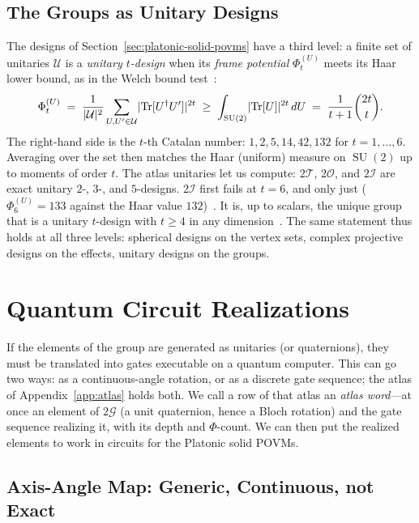 \documentclass[11pt, oneside, openany]{scrbook}
\DeclareMathOperator{\SU}{SU}
\DeclareMathOperator{\Tr}{Tr}
\newcommand{\Tgroup}{\mathcal{T}}  %
\newcommand{\Ogroup}{\mathcal{O}}  %
\newcommand{\Igroup}{\mathcal{I}}  %
\newcommand{\Ggroup}{\mathcal{G}}
\newcommand{\TwoT}{2\Tgroup}
\newcommand{\TwoO}{2\Ogroup}
\newcommand{\TwoI}{2\Igroup}
\newcommand{\TwoG}{2\Ggroup}
\DeclarePairedDelimiter{\abs}{\lvert}{\rvert}
\begin{document}
\subsection{The Groups as Unitary Designs} \label{subsec:unitary-designs}

The designs of Section~\ref{sec:platonic-solid-povms} have a third level: a finite set of unitaries $\mathcal{U}$ is a \textit{unitary $t$-design} when its \textit{frame potential} $\Phi_t^{(U)}$ meets its Haar lower bound, as in the Welch bound test~\cite{roy2009unitarydesignscodes}:
$$\Phi_t^{(U)} \;=\; \frac{1}{\abs{\mathcal{U}}^2}\sum_{U, U' \in \mathcal{U}} \abs{\Tr[U^\dagger U']}^{2t} \;\ge\; \int_{\SU(2)} \abs{\Tr[U]}^{2t} \, dU \;=\; \frac{1}{t+1}\binom{2t}{t}.$$
The right-hand side is the $t$-th Catalan number: $1, 2, 5, 14, 42, 132$ for $t = 1, \dots, 6$. Averaging over the set then matches the Haar (uniform) measure on $\SU(2)$ up to moments of order $t$. The atlas unitaries let us compute: $\TwoT$, $\TwoO$, and $\TwoI$ are exact unitary $2$-, $3$-, and $5$-designs. $\TwoI$ first fails at $t = 6$, and only just ($\Phi_6^{(U)} = 133$ against the Haar value $132$)~\cite{gross2007evenlydistributedunitaries}. It is, up to scalars, the unique group that is a unitary $t$-design with $t \ge 4$ in any dimension~\cite[Cor.~2]{bannai2018unitarytgroups}. The same statement thus holds at all three levels: spherical designs on the vertex sets, complex projective designs on the effects, unitary designs on the groups.

\section{Quantum Circuit Realizations} \label{sec:circuit-realizations}

If the elements of the group are generated as unitaries (or quaternions), they must be translated into gates executable on a quantum computer. This can go two ways: as a continuous-angle rotation, or as a discrete gate sequence; the atlas of Appendix~\ref{app:atlas} holds both. We call a row of that atlas an \textit{atlas word}---at once an element of $\TwoG$ (a unit quaternion, hence a Bloch rotation) and the gate sequence realizing it, with its depth and $\Phi$-count. We can then put the realized elements to work in circuits for the Platonic solid POVMs.

\subsection{Axis-Angle Map: Generic, Continuous, not Exact}
\end{document}
